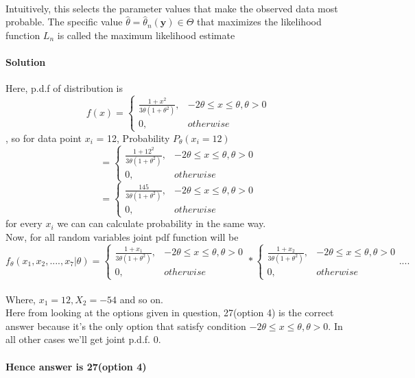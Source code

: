 \documentclass{article}
\begin{document}
\paragraph{}
Intuitively, this selects the parameter values that make the observed data most probable. The specific value \({\hat {\theta }}={\hat {\theta }}_{n}(\mathbf {y} )\in \Theta \) that maximizes the likelihood function \( L_{n}\) is called the maximum likelihood estimate
\paragraph{Solution}
Here, p.d.f of distribution is \[
    f(x)= 
\begin{cases}
\frac{1 + x^2}{3\theta(1+\theta^2)},& -2\theta \leq x \leq \theta, \theta > 0\\
    0,              & otherwise
\end{cases}
\], so for data point \(x_i\) = 12, Probability \(P_\theta(x_i = 12)\)  \[= \begin{cases}
\frac{1 + 12^2}{3\theta(1+\theta^2)},& -2\theta \leq x \leq \theta, \theta > 0\\
    0,              & otherwise
\end{cases}
\]
\[= \begin{cases}
\frac{145}{3\theta(1+\theta^2)},& -2\theta \leq x \leq \theta, \theta > 0\\
    0,              & otherwise
\end{cases}
\] 
for every \(x_i\) we can can calculate probability in the same way. \\
Now, for all random variables joint pdf function will be 
\[f_\theta(x_1,x_2,....,x_7 | \theta)= \begin{cases}
\frac{1 + x_1}{3\theta(1+\theta^2)},& -2\theta \leq x \leq \theta, \theta > 0\\
    0,              & otherwise
\end{cases} * \begin{cases}
\frac{1 + x_2}{3\theta(1+\theta^2)},& -2\theta \leq x \leq \theta, \theta > 0\\
    0,              & otherwise
\end{cases} ....
\] 
\\ 
Where, \(x_1 = 12, X_2 = -54\) and so on.
\\ Here from looking at the options given in question, 27(option 4) is the correct answer because it's the only option that satisfy condition \(-2\theta \leq x \leq \theta , \theta > 0\). In all other cases we'll get joint p.d.f. 0.
\\\paragraph{}
\textbf{Hence answer is 27(option 4)}
\end{document}
